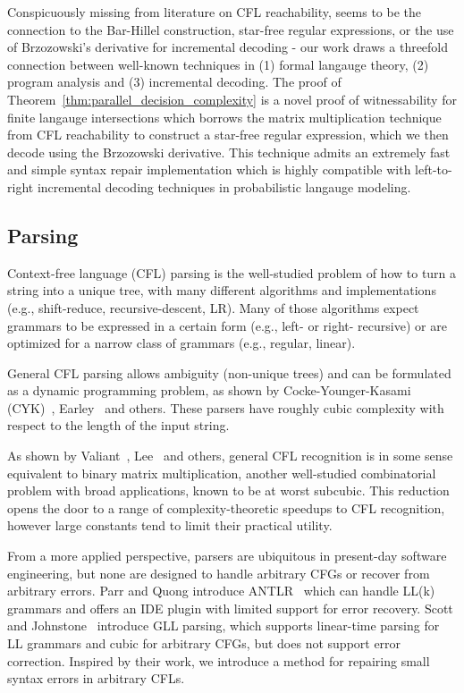 \documentclass[sigplan,review,acmsmall,nonacm,screen,anonymous]{acmart}\settopmatter{printfolios=false,printccs=false,printacmref=false}
\begin{document}
Conspicuously missing from literature on CFL reachability, seems to be the connection to the Bar-Hillel construction, star-free regular expressions, or the use of Brzozowski's derivative for incremental decoding - our work draws a threefold connection between well-known techniques in (1) formal langauge theory, (2) program analysis and (3) incremental decoding. The proof of Theorem~\ref{thm:parallel_decision_complexity} is a novel proof of witnessability for finite langauge intersections which borrows the matrix multiplication technique from CFL reachability to construct a star-free regular expression, which we then decode using the Brzozowski derivative. This technique admits an extremely fast and simple syntax repair implementation which is highly compatible with left-to-right incremental decoding techniques in probabilistic langauge modeling.

\subsection{Parsing}

Context-free language (CFL) parsing is the well-studied problem of how to turn a string into a unique tree, with many different algorithms and implementations (e.g., shift-reduce, recursive-descent, LR). Many of those algorithms expect grammars to be expressed in a certain form (e.g., left- or right- recursive) or are optimized for a narrow class of grammars (e.g., regular, linear).

General CFL parsing allows ambiguity (non-unique trees) and can be formulated as a dynamic programming problem, as shown by Cocke-Younger-Kasami (CYK)~\cite{sakai1961syntax}, Earley~\cite{earley1970efficient} and others. These parsers have roughly cubic complexity with respect to the length of the input string.

As shown by Valiant~\cite{valiant1975general}, Lee~\cite{lee2002fast} and others, general CFL recognition is in some sense equivalent to binary matrix multiplication, another well-studied combinatorial problem with broad applications, known to be at worst subcubic. This reduction opens the door to a range of complexity-theoretic speedups to CFL recognition, however large constants tend to limit their practical utility.

From a more applied perspective, parsers are ubiquitous in present-day software engineering, but none are designed to handle arbitrary CFGs or recover from arbitrary errors. Parr and Quong introduce ANTLR~\cite{parr1995antlr} which can handle LL(k) grammars and offers an IDE plugin with limited support for error recovery. Scott and Johnstone~\cite{scott2010gll} introduce GLL parsing, which supports linear-time parsing for LL grammars and cubic for arbitrary CFGs, but does not support error correction. Inspired by their work, we introduce a method for repairing small syntax errors in arbitrary CFLs.
\end{document}
